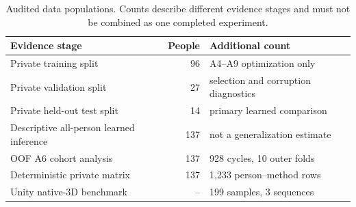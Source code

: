 \begin{table}[t]
\centering
\caption{Audited data populations. Counts describe different evidence stages
and must not be combined as one completed experiment.}
\label{tab:data-status}
\small
\begin{tabular}{l r l}
\toprule
Evidence stage & People & Additional count \\
\midrule
Private training split & 96 & A4--A9 optimization only \\
Private validation split & 27 & selection and corruption diagnostics \\
Private held-out test split & 14 & primary learned comparison \\
Descriptive all-person learned inference & 137 & not a generalization estimate \\
OOF A6 cohort analysis & 137 & 928 cycles, 10 outer folds \\
Deterministic private matrix & 137 & 1,233 person--method rows \\
Unity native-3D benchmark & -- & 199 samples, 3 sequences \\
\bottomrule
\end{tabular}
\end{table}
